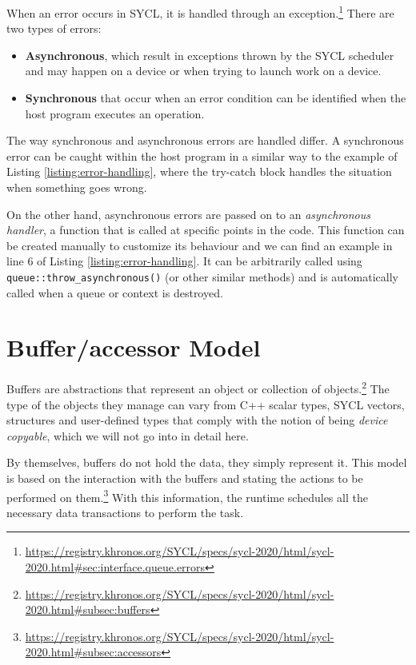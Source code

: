 When an error occurs in SYCL, it is handled through an exception.\footnote{\url{https://registry.khronos.org/SYCL/specs/sycl-2020/html/sycl-2020.html\#sec:interface.queue.errors}}
There are two types of errors:
\begin{itemize}
    \item \textbf{Asynchronous}, which result in exceptions thrown by the SYCL scheduler and may happen on a device or when trying to launch work on a device.
    \item \textbf{Synchronous} that occur when an error condition can be identified when the host program executes an operation.
\end{itemize}
\pagebreak


The way synchronous and asynchronous errors are handled differ.
A synchronous error can be caught within the host program in a similar way to the example of Listing \ref{listing:error-handling}, where the try-catch block handles the situation when something goes wrong.

On the other hand, asynchronous errors are passed on to an \textit{asynchronous handler}, a function that is called at specific points in the code.
This function can be created manually to customize its behaviour and we can find an example in line 6 of Listing \ref{listing:error-handling}.
It can be arbitrarily called using \texttt{queue::throw\_asynchronous()} (or other similar methods) and is automatically called when a queue or context is destroyed.

\section{Buffer/accessor Model} \label{sec:buffer-accessor}

Buffers are abstractions that represent an object or collection of objects.\footnote{\url{https://registry.khronos.org/SYCL/specs/sycl-2020/html/sycl-2020.html\#subsec:buffers}}
The type of the objects they manage can vary from C++ scalar types, SYCL vectors, structures and user-defined types that comply with the notion of being \textit{device copyable}, which we will not go into in detail here.

By themselves, buffers do not hold the data, they simply represent it.
This model is based on the interaction with the buffers and stating the actions to be performed on them.\footnote{\url{https://registry.khronos.org/SYCL/specs/sycl-2020/html/sycl-2020.html\#subsec:accessors}}
With this information, the runtime schedules all the necessary data transactions to perform the task.

